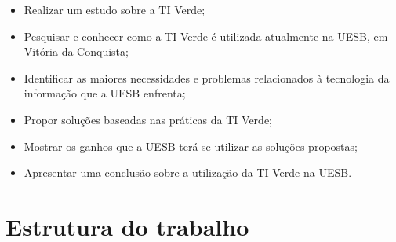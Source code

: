 \begin{itemize}
  \item Realizar um estudo sobre a TI Verde;
  \item Pesquisar e conhecer como a TI Verde é utilizada atualmente na UESB, em Vitória da Conquista;
  \item Identificar as maiores necessidades e problemas relacionados à tecnologia da informação que a UESB enfrenta;
  \item Propor soluções baseadas nas práticas da TI Verde;
  \item Mostrar os ganhos que a UESB terá se utilizar as soluções propostas;
  \item Apresentar uma conclusão sobre a utilização da TI Verde na UESB.
\end{itemize}


\section{Estrutura do trabalho}